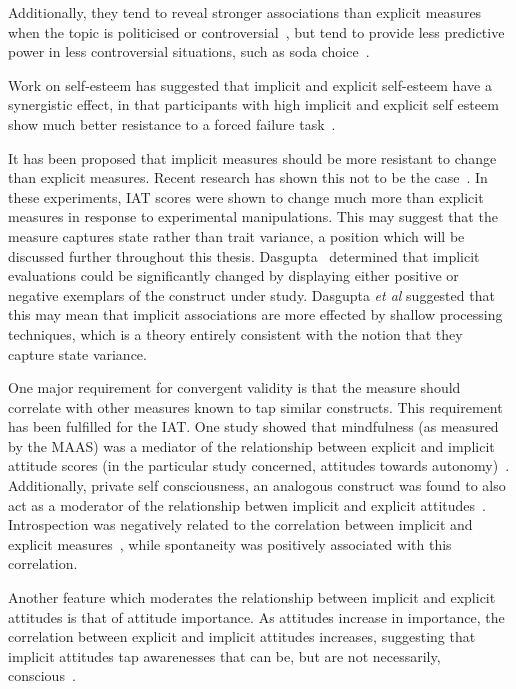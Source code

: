 Additionally, they tend to reveal stronger associations than explicit measures when the topic is politicised or controversial~\cite{Greenwald2009}, but tend to provide less predictive power in less controversial situations, such as soda choice~\cite{Karpinski2006}.

Work on self-esteem has suggested that implicit and explicit self-esteem have a synergistic effect, in that participants with high implicit and explicit self esteem show much better resistance to a forced failure task~\cite{Meagher2004}. %

It has been proposed that implicit measures should be more resistant to change than explicit measures. Recent research has shown this not to be the case~\cite{Meagher2004,Gschwendner2008}. In these experiments, IAT scores were shown to change much more than explicit measures in response to experimental manipulations. This may suggest that the measure captures state rather than trait variance, a position which will be discussed further throughout this thesis. Dasgupta~\cite{Dasgupta2001} determined that implicit evaluations could be significantly changed by displaying either positive or negative exemplars of the construct under study. Dasgupta \textit{et al} suggested that this may mean that implicit associations are more effected by shallow processing techniques, which is a theory entirely consistent with the notion that they capture state variance. 

One major requirement for convergent validity is that the measure should correlate with other measures known to tap similar constructs. This requirement has been fulfilled for the IAT. One study showed that mindfulness (as measured by the MAAS) was a mediator of the relationship between explicit and implicit attitude scores (in the particular study concerned, attitudes towards autonomy)~\cite{Levesque2007}. Additionally, private self consciousness, an analogous construct was found to also act as a moderator of the relationship betwen implicit and explicit attitudes~\cite{Gschwendner2006}. Introspection was negatively related to the correlation between implicit and explicit measures~\cite{Hofmann2005}, while spontaneity was positively associated with this correlation. 

Another feature which moderates the relationship between implicit and explicit attitudes is that of attitude importance. As attitudes increase in importance, the correlation between explicit and implicit attitudes increases, suggesting that implicit attitudes tap awarenesses that can be, but are not necessarily, conscious~\cite{Karpinski2005}. 


